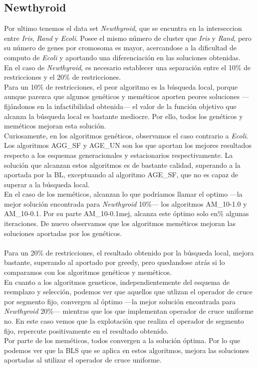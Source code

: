 \subsection{Newthyroid}
Por ultimo tenemos el data set \emph{Newthyroid}, que se encuntra en la interseccion entre \emph{Iris}, \emph{Rand} y \emph{Ecoli}. Posee el mismo número de cluster que \emph{Iris} y \emph{Rand}, pero su número de genes por cromosoma es mayor, acercandose a la dificultad de computo de \emph{Ecoli} y aportando una diferenciación en las soluciones obtenidas.
\\
En el caso de \emph{Newthyroid}, es necesario establecer una separación entre el 10\% de restricciones y el 20\% de restricciones.
\\
Para un 10\% de restricciones, el peor algoritmo es la búsqueda local, porque aunque parezca que algunos genéticos y meméticos aporten peores soluciones ---fijándonos en la infactibilidad obtenida---  el valor de la función objetivo que alcanza la búsqueda local es bastante mediocre. Por ello, todos los genéticos y meméticos mejoran esta solución.
\\
Curiosamente, en los algoritmos genéticos, observamos el caso contrario a \emph{Ecoli}. Los algoritmos AGG\_SF y AGE\_UN son los que aportan los mejores resultados respecto a los esquemas generacionales y estacionarios respectivamente. La solución que alcanzan estos algoritmos es de bastante calidad, superando a la aportada por la BL, exceptuando al algoritmo AGE\_SF, que no es capaz de superar a la búsqueda local.
\\
En el caso de los meméticos, alcanzan lo que podríamos llamar el optimo ---la mejor solución encontrada para \emph{Newthyroid} 10\%--- los algoritmos AM\_10-1.0 y AM\_10-0.1. Por su parte AM\_10-0.1mej, alcanza este óptimo solo en\% algunas iteraciones. De nuevo observamos que los algoritmos meméticos mejoran las soluciones aportadas por los genéticos.\\
\\
Para un 20\% de restricciones, el resultado obtenido por la búsqueda local, mejora bastante, superando al aportado por greedy, pero quedandose atrás si lo comparamos con los algoritmos genéticos y meméticos.
\\
En cuanto a los algoritmos geneticos, independientemente del esquema de reemplazo y selección, podemos ver que aquellos que utlizan el operador de cruce por segmento fijo, convergen al óptimo ---la mejor solución encontrada para \emph{Newthyroid} 20\%--- mientras que los que implementan operador de cruce uniforme no. En este caso vemos que la explotación que realiza el operador de segmento fijo, repercute positivamente en el resultado obtenido.
\\
Por parte de los meméticos, todos convergen a la solución óptima. Por lo que podemos ver que la BLS que se aplica en estos algoritmos, mejora las soluciones aportadas al utilizar el operador de cruce uniforme.

